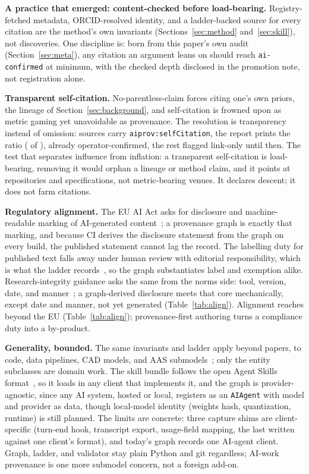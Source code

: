 \textbf{A practice that emerged: content-checked before load-bearing.}
Registry-fetched metadata, ORCID-resolved identity, and a
ladder-backed source for every citation are the method's own
invariants (Sections~\ref{sec:method} and~\ref{sec:skill}), not
discoveries. One discipline is: born from this paper's own audit
(Section~\ref{sec:meta}), any citation an argument leans on should
reach \texttt{ai-confirmed} at minimum, with the checked depth
disclosed in the promotion note, not registration alone.

\textbf{Transparent self-citation.} No-parentless-claim forces citing
one's own priors, the lineage of Section~\ref{sec:background}, and
self-citation is frowned upon as metric gaming yet unavoidable as
provenance. The resolution is transparency instead of omission:
sources carry \texttt{aiprov:selfCitation}, the report prints the
ratio (\MSrcSelf{} of \MSources), \MSrcSelfHuman{} already
operator-confirmed, the rest flagged link-only until then. The test
that separates influence from inflation: a transparent self-citation
is load-bearing, removing it would orphan a lineage or method claim,
and it points at repositories and specifications, not metric-bearing
venues. It declares descent; it does not farm citations.

\textbf{Regulatory alignment.} The EU AI Act asks for disclosure and
machine-readable marking of AI-generated content~\cite{eu-ai-act2024};
a provenance graph is exactly that marking, and because CI derives
the disclosure statement from the graph on every build, the published
statement cannot lag the record. The labelling duty for published
text falls away under human review with editorial responsibility,
which is what the ladder records~\cite{eu-ai-icons2026}, so the graph
substantiates label and exemption alike. Research-integrity guidance
asks the same from the norms side: tool, version, date, and
manner~\cite{faq-ai-gwp2025}; a graph-derived disclosure meets that
core mechanically, except date and manner, not yet generated
(Table~\ref{tab:align}). Alignment reaches beyond the EU
(Table~\ref{tab:align}); provenance-first authoring turns a
compliance duty into a by-product.

\textbf{Generality, bounded.} The same invariants and ladder apply
beyond papers, to code, data pipelines, CAD models, and AAS
submodels~\cite{aas-part1-v30rc02}; only the entity subclasses are
domain work. The skill bundle follows the open Agent Skills
format~\cite{agent-skills-spec}, so it loads in any client that
implements it, and the graph is provider-agnostic, since any AI
system, hosted or local, registers as an \texttt{AIAgent} with model
and provider as data, though local-model identity (weights hash,
quantization, runtime) is still planned. The limits are concrete:
three capture shims are client-specific (turn-end hook, transcript
export, usage-field mapping, the last written against one client's
format), and today's graph records one AI-agent client. Graph,
ladder, and validator stay plain Python and git regardless; AI-work
provenance is one more submodel concern, not a foreign add-on.

